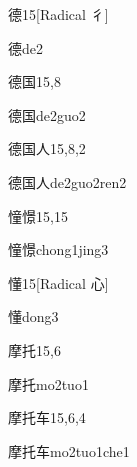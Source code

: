 \begin{entry}{德}{15}[Radical 彳]
  \begin{phonetics}{德}{de2}
  \end{phonetics}
\end{entry}

\begin{entry}{德国}{15,8}
  \begin{phonetics}{德国}{de2guo2}
  \end{phonetics}
\end{entry}

\begin{entry}{德国人}{15,8,2}
  \begin{phonetics}{德国人}{de2guo2ren2}
  \end{phonetics}
\end{entry}

\begin{entry}{憧憬}{15,15}
  \begin{phonetics}{憧憬}{chong1jing3}
  \end{phonetics}
\end{entry}

\begin{entry}{懂}{15}[Radical 心]
  \begin{phonetics}{懂}{dong3}
  \end{phonetics}
\end{entry}

\begin{entry}{摩托}{15,6}
  \begin{phonetics}{摩托}{mo2tuo1}
  \end{phonetics}
\end{entry}

\begin{entry}{摩托车}{15,6,4}
  \begin{phonetics}{摩托车}{mo2tuo1che1}
  \end{phonetics}
\end{entry}


